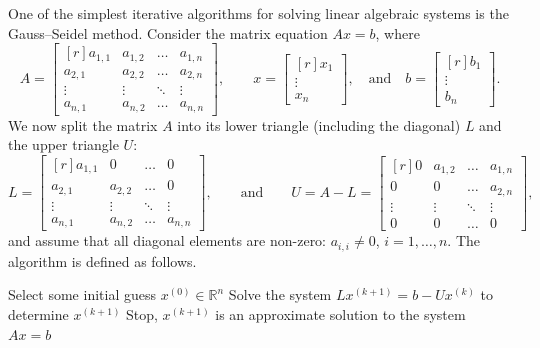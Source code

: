 \documentclass[10pt,a4paper]{article}
\newcommand{\R}{\mathbb{R}}
\theoremstyle{plain}
\theoremstyle{definition}
\begin{document}
One of the simplest iterative algorithms for solving linear algebraic systems is the Gauss--Seidel method.
Consider the matrix equation \(Ax = b\), where
\[
  A =
  \begin{bmatrix*}[r]
    a_{1,1} & a_{1,2} & \dots & a_{1,n}\\
    a_{2,1} & a_{2,2} & \dots & a_{2,n}\\
    \vdots  & \vdots & \ddots &\vdots\\
    a_{n,1} & a_{n,2} & \dots & a_{n,n}
  \end{bmatrix*},
  \qquad
  x = \begin{bmatrix*}[r] x_1\\\vdots \\ x_n\end{bmatrix*},
  \quad
  \text{and}
  \quad
  b = \begin{bmatrix*}[r] b_1\\\vdots \\ b_n\end{bmatrix*}.
\]
We now split the matrix \(A\) into its lower triangle (including the diagonal)
\(L\) and the upper triangle \(U\):
\[
L =
\begin{bmatrix*}[r]
  a_{1,1} & 0 & \dots & 0\\
  a_{2,1} & a_{2,2} & \dots & 0\\
  \vdots  & \vdots & \ddots &\vdots\\
  a_{n,1} & a_{n,2} & \dots & a_{n,n}
\end{bmatrix*},
\qquad
\text{and}
\qquad
U = A-L =
\begin{bmatrix*}[r]
  0 & a_{1,2} & \dots & a_{1,n}\\
  0 & 0 & \dots & a_{2,n}\\
  \vdots  & \vdots & \ddots &\vdots\\
  0 & 0 & \dots & 0
\end{bmatrix*},
\]
and assume that all diagonal elements are non-zero: \(a_{i,i}\neq 0\), \(i=1,\dots,n\).
The algorithm is defined as follows.
\begin{algorithmic}[1]
\STATE Select some initial guess \(x^{(0)} \in \R^n\)
  \STATE Solve the system
  \(L x^{(k+1)} = b - Ux^{(k)}\) to determine \(x^{(k+1)}\)
    \STATE Stop, \(x^{(k+1)}\) is an approximate solution
    to the system \(Ax=b\)
  \ENDIF
\ENDFOR
\end{algorithmic}
\end{document}
